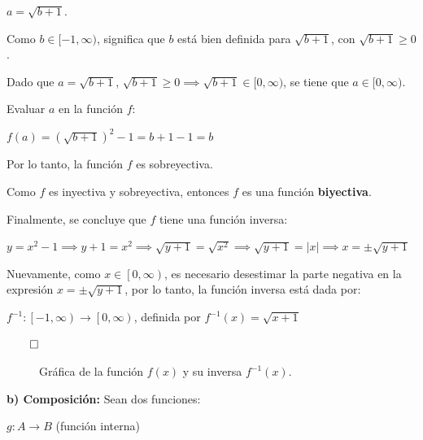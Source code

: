 \documentclass{article}
\begin{document}
$a = \sqrt{b + 1}$.

Como $b \in [-1, \infty)$, significa que $b$ está bien definida para $\sqrt{b + 1}$, con $\sqrt{b + 1} \ge 0$.  

Dado que $a = \sqrt{b + 1}$, $\sqrt{b + 1} \ge 0 \implies \sqrt{b + 1} \in [0, \infty)$, se tiene que $a \in [0, \infty)$. 

Evaluar $a$ en la función $f$:

$f(a) = (\sqrt{b + 1})^2 - 1 = b + 1 - 1 = b$

Por lo tanto, la función $f$ es sobreyectiva.

Como $f$ es inyectiva y sobreyectiva, entonces $f$ es una función \textbf{biyectiva}.

Finalmente, se concluye que $f$ tiene una función inversa:

$y = x^2 - 1 \implies y + 1 = x^2 \implies \sqrt{y + 1} = \sqrt{x^2} \implies \sqrt{y + 1} = \left|x\right| \implies x = \pm \sqrt{y + 1}$

Nuevamente, como $x \in \left[0, \infty \right)$, es necesario desestimar la parte negativa en la expresión $x = \pm \sqrt{y + 1}$, por lo tanto, la función inversa está dada por:

$f^{-1}: \left[-1, \infty \right) \to \left[0, \infty \right)$, definida por $f^{-1}(x) = \sqrt{x + 1}$

$\qed$

\begin{figure}[H]
\centering
{}
\caption{Gráfica de la función $f(x)$ y su inversa $f^{-1}(x)$.}
\end{figure}

\textbf{b) Composición:} Sean dos funciones:

$g: A \to B$ (función interna)
\end{document}
